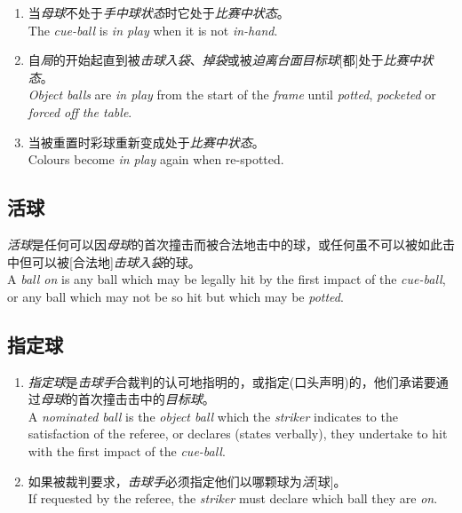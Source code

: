 \begin{enumerate}[label=(\alph*)]
    \item 当\textit{母球}不处于\textit{手中球状态}时它处于\textit{比赛中状态}。\\
    The \textit{cue-ball} is \textit{in play} when it is not \textit{in-hand}.
    \item 自\textit{局}的开始起直到被\textit{击球入袋}、\textit{掉袋}或被\textit{迫离台面}\textit{目标球}[都]处于\textit{比赛中状态}。\\
    \textit{Object balls} are \textit{in play} from the start of the \textit{frame} until \textit{potted}, \textit{pocketed} or \textit{forced off the table}.
    \item 当被重置时彩球重新变成处于\textit{比赛中状态}。\\
    Colours become \textit{in play} again when re-spotted.
\end{enumerate}

\subsection{活球}

\noindent \textit{活球}是任何可以因\textit{母球}的首次撞击而被合法地击中的球，或任何虽不可以被如此击中但可以被[合法地]\textit{击球入袋}的球。\\
A \textit{ball on} is any ball which may be legally hit by the first impact of the \textit{cue-ball}, or any ball which may not be so hit but which may be \textit{potted}.

\subsection{指定球}

\begin{enumerate}[label=(\alph*)]
    \item \textit{指定球}是\textit{击球手}合裁判的认可地指明的，或指定(口头声明)的，他们承诺要通过\textit{母球}的首次撞击击中的\textit{目标球}。\\
    A \textit{nominated ball} is the \textit{object ball} which the \textit{striker} indicates to the satisfaction of the referee, or declares (states verbally), they undertake to hit with the first impact of the \textit{cue-ball}.
    \item 如果被裁判要求，\textit{击球手}必须指定他们以哪颗球为\textit{活}[球]。\\
    If requested by the referee, the \textit{striker} must declare which ball they are \textit{on}.
\end{enumerate}


